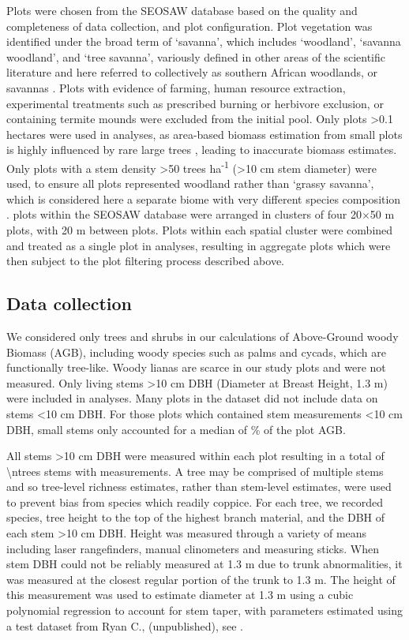 \begin{refsection}
Plots were chosen from the SEOSAW database based on the quality and completeness of data collection, and plot configuration. Plot vegetation was identified under the broad term of `savanna', which includes `woodland', `savanna woodland', and `tree savanna', variously defined in other areas of the scientific literature and here referred to collectively as southern African woodlands, or savannas \citep{Ratnam2011, Hill2010}. Plots with evidence of farming, human resource extraction, experimental treatments such as prescribed burning or herbivore exclusion, or containing termite mounds were excluded from the initial pool. Only plots >0.1 hectares were used in analyses, as area-based biomass estimation from small plots is highly influenced by rare large trees \citep{Stegen2011}, leading to inaccurate biomass estimates. Only plots with a stem density >50 trees ha\textsuperscript{-1} (>10 cm stem diameter) were used, to ensure all plots represented woodland rather than `grassy savanna', which is considered here a separate biome with very different species composition \citep{Parr2014}. \nzam{} plots within the SEOSAW database were arranged in clusters of four 20$\times$50 m plots, with 20 m between plots. Plots within each spatial cluster were combined and treated as a single plot in analyses, resulting in \nzamcluster{} aggregate plots which were then subject to the plot filtering process described above.

\subsection{Data collection}
\label{befr:ssec:data}
 
We considered only trees and shrubs in our calculations of Above-Ground woody Biomass (AGB), including woody species such as palms and cycads, which are functionally tree-like. Woody lianas are scarce in our study plots and were not measured. Only living stems >10 cm DBH (Diameter at Breast Height, 1.3 m) were included in analyses. Many plots in the dataset did not include data on stems <10 cm DBH. For those plots which contained stem measurements <10 cm DBH, small stems only accounted for a median of \percsmallagb{}\% of the plot AGB. 

All stems >10 cm DBH were measured within each plot resulting in a total of \num[group-separator={,}]{\ntrees} stems with measurements. A tree may be comprised of multiple stems and so tree-level richness estimates, rather than stem-level estimates, were used to prevent bias from species which readily coppice. For each tree, we recorded species, tree height to the top of the highest branch material, and the DBH of each stem >10 cm DBH. Height was measured through a variety of means including laser rangefinders, manual clinometers and measuring sticks. When stem DBH could not be reliably measured at 1.3 m due to trunk abnormalities, it was measured at the closest regular portion of the trunk to 1.3 m. The height of this measurement was used to estimate diameter at 1.3 m using a cubic polynomial regression to account for stem taper, with parameters estimated using a test dataset from Ryan C., (unpublished), see \citet{Godlee2020}. 


\end{refsection}
